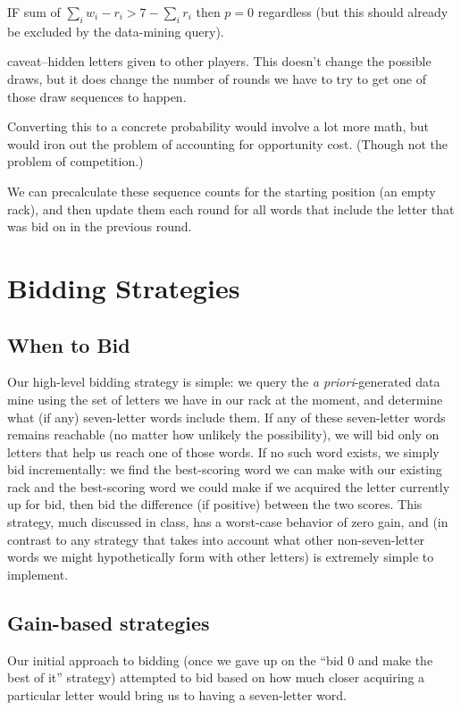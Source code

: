 \documentclass[11pt]{article}
\begin{document}
IF sum of $ \sum_{i}w_{i} - r_{i} > 7 - \sum_{i} r_{i}$ then $p = 0$ regardless (but this should already be excluded by the data-mining query).

caveat--hidden letters given to other players.  This doesn't change the possible draws, but it does change the number of rounds we have to try to get one of those draw sequences to happen.

Converting this to a concrete probability would involve a lot more math, but would iron out the problem of accounting for opportunity cost.  (Though not the problem of competition.)

We can precalculate these sequence counts for the starting position (an empty rack), and then update them each round for all words that include the letter that was bid on in the previous round.

\section{Bidding Strategies}

\subsection{When to Bid}

Our high-level bidding strategy is simple: we query the {\it a priori}-generated data mine using the set of letters we have in our rack at the moment, and determine what (if any) seven-letter words include them.  If any of these seven-letter words remains reachable (no matter how unlikely the possibility), we will bid only on letters that help us reach one of those words.
If no such word exists, we simply bid incrementally: we find the best-scoring word we can make with our existing rack and the best-scoring word we could make if we acquired the letter currently up for bid, then bid the difference (if positive) between the two scores.  This strategy, much discussed in class, has a worst-case behavior of zero gain, and (in contrast to any strategy that takes into account what other non-seven-letter words we might hypothetically form with other letters) is extremely simple to implement.

\subsection{Gain-based strategies}

Our initial approach to bidding (once we gave up on the ``bid 0 and make the best of it'' strategy) attempted to bid based on how much closer acquiring a particular letter would bring us to having a seven-letter word.  
\end{document}
